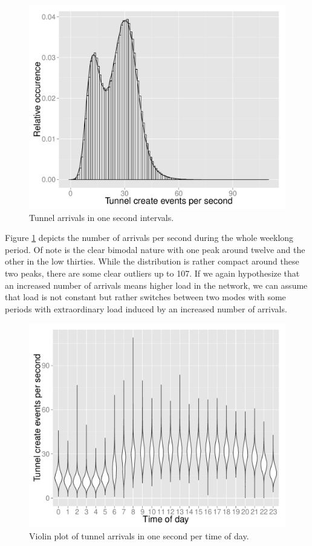 \begin{figure}[htbp]
	\centering
	\includegraphics[width=\columnwidth]{images/create_freq.pdf}
	\caption{Tunnel arrivals in one second intervals.}
	\label{c4:fig:freq-arrivals}
\end{figure}

Figure \ref{c4:fig:freq-arrivals} depicts the number of arrivals per second during the whole weeklong period. Of note is the clear bimodal nature with one peak around twelve and the other in the low thirties. While the distribution is rather compact around these two peaks, there are some clear outliers up to 107.
If we again hypothesize that an increased number of arrivals means higher load in the network, we can assume that load is not constant but rather switches between two modes with some periods with extraordinary load induced by an increased number of arrivals.

\begin{figure}[htbp]
	\centering
	\includegraphics[width=\columnwidth]{images/R-createspersecond-1h-violin.pdf}
	\caption{Violin plot of tunnel arrivals in one second per time of day.}
	\label{c4:fig:freq-arrivals-per-second-violin}
\end{figure}

